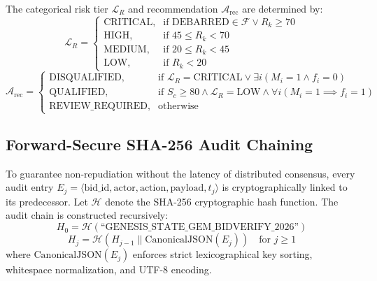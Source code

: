 \documentclass[conference]{IEEEtran}
\begin{document}
The categorical risk tier $\mathcal{L}_R$ and recommendation $\mathcal{A}_{\text{rec}}$ are determined by:
\begin{equation}
\mathcal{L}_R = \begin{cases}
\text{CRITICAL}, & \text{if } \text{DEBARRED} \in \mathcal{F} \lor R_k \ge 70 \\
\text{HIGH}, & \text{if } 45 \le R_k < 70 \\
\text{MEDIUM}, & \text{if } 20 \le R_k < 45 \\
\text{LOW}, & \text{if } R_k < 20
\end{cases}
\end{equation}
\begin{equation}
\mathcal{A}_{\text{rec}} = \begin{cases}
\text{DISQUALIFIED}, & \text{if } \mathcal{L}_R = \text{CRITICAL} \lor \exists i (M_i=1 \land f_i=0) \\
\text{QUALIFIED}, & \text{if } S_c \ge 80 \land \mathcal{L}_R = \text{LOW} \land \forall i (M_i=1 \implies f_i=1) \\
\text{REVIEW\_REQUIRED}, & \text{otherwise}
\end{cases}
\end{equation}

\subsection{Forward-Secure SHA-256 Audit Chaining}
To guarantee non-repudiation without the latency of distributed consensus, every audit entry $E_j = \langle \text{bid\_id}, \text{actor}, \text{action}, \text{payload}, t_j \rangle$ is cryptographically linked to its predecessor. Let $\mathcal{H}$ denote the SHA-256 cryptographic hash function. The audit chain is constructed recursively:
\begin{equation}
H_0 = \mathcal{H}(\text{``GENESIS\_STATE\_GEM\_BIDVERIFY\_2026''})
\end{equation}
\begin{equation}
H_j = \mathcal{H}\left(H_{j-1} \parallel \text{CanonicalJSON}(E_j)\right) \quad \text{for } j \ge 1
\end{equation}
where $\text{CanonicalJSON}(E_j)$ enforces strict lexicographical key sorting, whitespace normalization, and UTF-8 encoding. 
\end{document}
